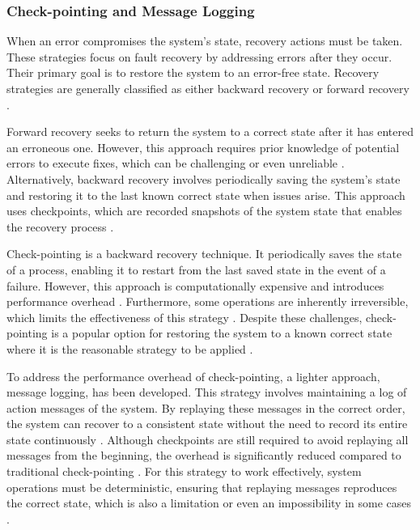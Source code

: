 \subsubsection{Check-pointing and Message Logging}

When an error compromises the system’s state, recovery actions must be taken. These strategies focus on fault recovery by addressing errors after they occur. Their primary goal is to restore the system to an error-free state. Recovery strategies are generally classified as either backward recovery or forward recovery \cite{Tanenbaum2023}.

Forward recovery seeks to return the system to a correct state after it has entered an erroneous one. However, this approach requires prior knowledge of potential errors to execute fixes, which can be challenging or even unreliable \cite{Tanenbaum2023}. Alternatively, backward recovery involves periodically saving the system’s state and restoring it to the last known correct state when issues arise. This approach uses checkpoints, which are recorded snapshots of the system state that enables the recovery process \cite{Tanenbaum2023}.

Check-pointing is a backward recovery technique. It periodically saves the state of a process, enabling it to restart from the last saved state in the event of a failure. However, this approach is computationally expensive and introduces performance overhead \cite{Tanenbaum2023,Isukapalli2024}. Furthermore, some operations are inherently irreversible, which limits the effectiveness of this strategy \cite{Tanenbaum2023}. Despite these challenges, check-pointing is a popular option for restoring the system to a known correct state where it is the reasonable strategy to be applied \cite{Isukapalli2024,Ledmi2018}.

To address the performance overhead of check-pointing, a lighter approach, message logging, has been developed. This strategy involves maintaining a log of action messages of the system. By replaying these messages in the correct order, the system can recover to a consistent state without the need to record its entire state continuously \cite{Isukapalli2024,Ledmi2018}. Although checkpoints are still required to avoid replaying all messages from the beginning, the overhead is significantly reduced compared to traditional check-pointing \cite{Isukapalli2024}. For this strategy to work effectively, system operations must be deterministic, ensuring that replaying messages reproduces the correct state, which is also a limitation or even an impossibility in some cases \cite{Tanenbaum2023}.

